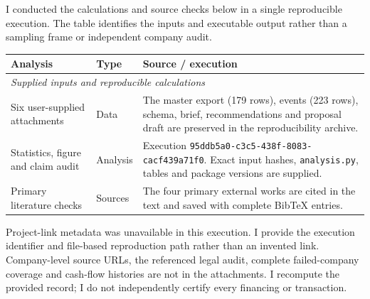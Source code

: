 \documentclass{article}
\newcommand{\trajgroup}[1]{\midrule\multicolumn{3}{l}{\textit{#1}}\\}
\begin{document}
I conducted the calculations and source checks below in a single reproducible execution. The table identifies the inputs and executable output rather than a sampling frame or independent company audit.

\small
\begin{longtable}{@{}p{4.5cm}p{2cm}p{8.5cm}@{}}
\toprule
\textbf{Analysis} & \textbf{Type} & \textbf{Source / execution} \\
\endhead
\trajgroup{Supplied inputs and reproducible calculations}
Six user-supplied attachments & Data & The master export (179 rows), events (223 rows), schema, brief, recommendations and proposal draft are preserved in the reproducibility archive. \\
Statistics, figure and claim audit & Analysis & Execution \texttt{95ddb5a0-c3c5-438f-8083-cacf439a71f0}. Exact input hashes, \texttt{analysis.py}, tables and package versions are supplied. \\
Primary literature checks & Sources & The four primary external works are cited in the text and saved with complete BibTeX entries. \\
\bottomrule
\end{longtable}
\normalsize
Project-link metadata was unavailable in this execution. I provide the execution identifier and file-based reproduction path rather than an invented link. Company-level source URLs, the referenced legal audit, complete failed-company coverage and cash-flow histories are not in the attachments. I recompute the provided record; I do not independently certify every financing or transaction.

\clearpage
{}
\printbibliography
\end{document}

